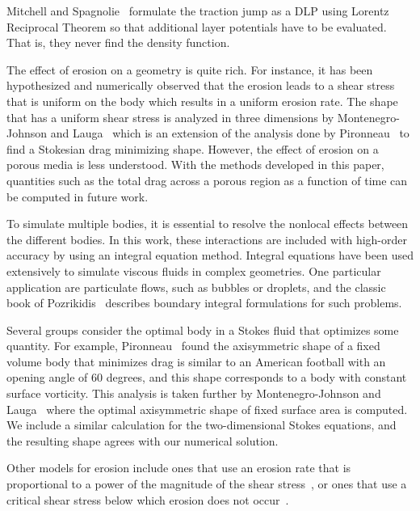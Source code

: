 \documentclass[preprint, 10pt]{elsarticle}
\begin{document}
Mitchell and Spagnolie~\cite{mit-spa2016} formulate the traction jump as
a DLP using Lorentz Reciprocal Theorem so that additional layer
potentials have to be evaluated.  That is, they never find the density
function.

The effect of erosion on a geometry is quite rich.  For instance, it has
been hypothesized and numerically observed that the erosion leads to a
shear stress that is uniform on the body which results in a uniform
erosion rate.  The shape that has a uniform shear stress is analyzed in
three dimensions by Montenegro-Johnson and Lauga~\cite{mon-lau2015}
which is an extension of the analysis done by Pironneau~\cite{pir1973}
to find a Stokesian drag minimizing shape.  However, the effect of
erosion on a porous media is less understood.  With the methods
developed in this paper, quantities such as the total drag across a
porous region as a function of time can be computed in future work.

To simulate multiple bodies, it is essential to resolve the nonlocal
effects between the different bodies.  In this work, these interactions
are included with high-order accuracy by using an integral equation
method.  Integral equations have been used extensively to simulate
viscous fluids in complex geometries.  One particular application are
particulate flows, such as bubbles or droplets, and the classic book of
Pozrikidis~\cite{poz1992} describes boundary integral formulations for
such problems.

Several groups consider the optimal body in a Stokes fluid that
optimizes some quantity.  For example, Pironneau~\cite{pir1973} found
the axisymmetric shape of a fixed volume body that minimizes drag is
similar to an American football with an opening angle of 60 degrees, and
this shape corresponds to a body with constant surface vorticity.  This
analysis is taken further by Montenegro-Johnson and
Lauga~\cite{mon-lau2015} where the optimal axisymmetric shape of fixed
surface area is computed.  We include a similar calculation for the
two-dimensional Stokes equations, and the resulting shape agrees with
our numerical solution. 


Other models for erosion include ones that use an erosion rate that is
proportional to a power of the magnitude of the shear
stress~\cite{par-izu2000}, or ones that use a critical shear stress
below which erosion does not occur~\cite{lag2000}.


\end{document}

